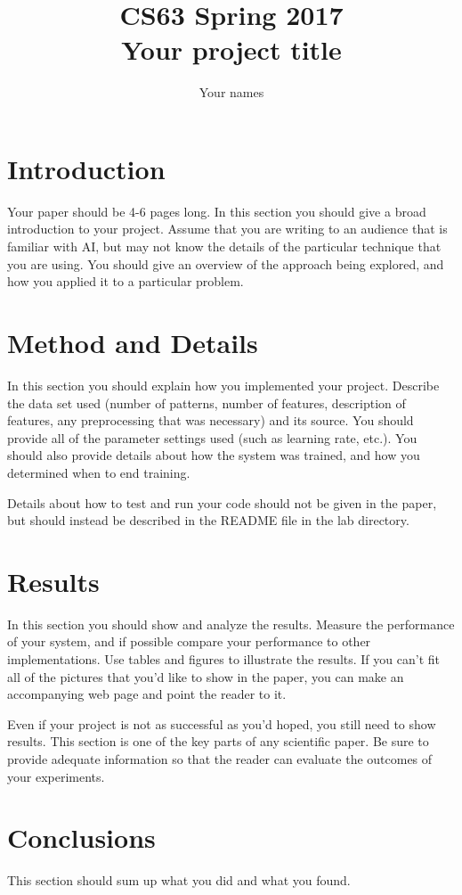 \documentclass[11pt]{article}
\title{CS63 Spring 2017\\Your project title}
\author{Your names}
\date{}
\begin{document}
\maketitle

\section{Introduction}

Your paper should be 4-6 pages long.  In this section you should give
a broad introduction to your project.  Assume that you are writing to
an audience that is familiar with AI, but may not know the details of
the particular technique that you are using.  You should give an
overview of the approach being explored, and how you applied it to a
particular problem.

\section{Method and Details}

In this section you should explain how you implemented your project.
Describe the data set used (number of patterns, number of features,
description of features, any preprocessing that was necessary) and its
source.  You should provide all of the parameter settings used (such
as learning rate, etc.).  You should also provide details about how
the system was trained, and how you determined when to end training.

Details about how to test and run your code should not be given in the
paper, but should instead be described in the README file in the lab
directory. 

\section{Results}

In this section you should show and analyze the results.  Measure the
performance of your system, and if possible compare your performance
to other implementations. Use tables and figures to illustrate the
results.  If you can't fit all of the pictures that you'd like to show
in the paper, you can make an accompanying web page and point the
reader to it.

Even if your project is not as successful as you'd hoped, you still
need to show results.  This section is one of the key parts of any
scientific paper.  Be sure to provide adequate information so that the
reader can evaluate the outcomes of your experiments. 

\section{Conclusions}

This section should sum up what you did and what you found. 
\end{document}
